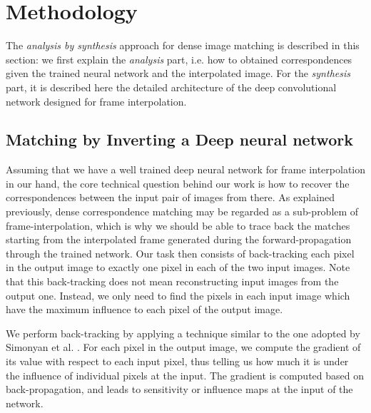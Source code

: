 \documentclass[runningheads]{llncs}
\begin{document}
	\section{Methodology}
	\label{sec:methodology}
	
	The \textit{analysis by synthesis} approach for dense image matching is described in this section: we first explain the \textit{analysis} part, i.e. how to obtained correspondences given the trained neural network and the interpolated image. For the \textit{synthesis} part, it is described here the detailed architecture of the deep convolutional network designed for frame interpolation.
	
	\subsection{Matching by Inverting a Deep neural network}
	
	Assuming that we have a well trained deep neural network for frame interpolation in our hand, the core technical question behind our work is how to recover the correspondences between the input pair of images from there. As explained previously, dense correspondence matching may be regarded as a sub-problem of frame-interpolation, which is why we should be able to trace back the matches starting from the interpolated frame generated during the forward-propagation through the trained network. Our task then consists of back-tracking each pixel in the output image to exactly one pixel in each of the two input images. Note that this back-tracking does not mean reconstructing input images from the output one. Instead, we only need to find the pixels in each input image which have the maximum influence to each pixel of the output image.
	
	We perform back-tracking by applying a technique similar to the one adopted by Simonyan et al. \cite{simonyan2013deep}. For each pixel in the output image, we compute the gradient of its value with respect to each input pixel, thus telling us how much it is under the influence of individual pixels at the input. The gradient is computed based on back-propagation, and leads to sensitivity or influence maps at the input of the network. 
	
\end{document}
